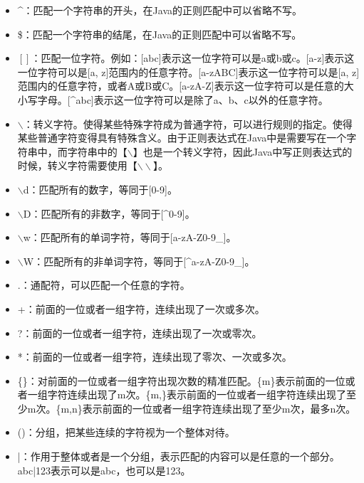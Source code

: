 \begin{itemize}
	\item \^{}：匹配一个字符串的开头，在Java的正则匹配中可以省略不写。

	\item \$：匹配一个字符串的结尾，在Java的正则匹配中可以省略不写。

	\item $ [] $：匹配一位字符。例如：[abc]表示这一位字符可以是a或b或c。[a-z]表示这一位字符可以是[a, z]范围内的任意字符。[a-zABC]表示这一位字符可以是[a, z]范围内的任意字符，或者A或B或C。[a-zA-Z]表示这一位字符可以是任意的大小写字母。[\^{}abc]表示这一位字符可以是除了a、b、c以外的任意字符。

	\item $ \backslash $：转义字符。使得某些特殊字符成为普通字符，可以进行规则的指定。使得某些普通字符变得具有特殊含义。由于正则表达式在Java中是需要写在一个字符串中，而字符串中的【$ \backslash $】也是一个转义字符，因此Java中写正则表达式的时候，转义字符需要使用【$ \backslash\backslash $】。

	\item $ \backslash $d：匹配所有的数字，等同于[0-9]。

	\item $ \backslash $D：匹配所有的非数字，等同于[\^{}0-9]。

	\item $ \backslash $w：匹配所有的单词字符，等同于[a-zA-Z0-9\_]。

	\item $ \backslash $W：匹配所有的非单词字符，等同于[\^{}a-zA-Z0-9\_]。

	\item .：通配符，可以匹配一个任意的字符。

	\item +：前面的一位或者一组字符，连续出现了一次或多次。

	\item ?：前面的一位或者一组字符，连续出现了一次或零次。

	\item *：前面的一位或者一组字符，连续出现了零次、一次或多次。

	\item \{\}：对前面的一位或者一组字符出现次数的精准匹配。\{m\}表示前面的一位或者一组字符连续出现了m次。\{m,\}表示前面的一位或者一组字符连续出现了至少m次。\{m,n\}表示前面的一位或者一组字符连续出现了至少m次，最多n次。

	\item ()：分组，把某些连续的字符视为一个整体对待。

	\item |：作用于整体或者是一个分组，表示匹配的内容可以是任意的一个部分。abc|123表示可以是abc，也可以是123。
\end{itemize}

